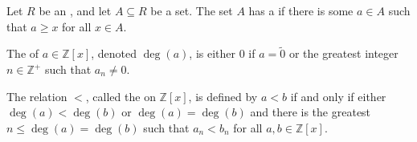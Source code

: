 \begin{definition}
	Let $R$ be an , and let $A \subseteq R$ be a set.
	The set $A$ has a \emph{} if there is some $a \in A$ such that $a \geq x$ for all $x \in A$.
\end{definition}

\begin{definition}
	The \emph{} of $a \in \mathbb{Z}[x]$, denoted $\deg(a)$, is either $0$ if $a = \widetilde{0}$ or the greatest integer $n \in \mathbb{Z}^{+}$ such that $a_n \not= 0$.
\end{definition}

\begin{definition}
	The relation $<$, called the \emph{} on $\mathbb{Z}[x]$, is defined by $a < b$ if and only if either $\deg(a) < \deg(b)$ or $\deg(a) = \deg(b)$ and there is the greatest ${n \leq \deg(a) = \deg(b)}$ such that $a_n < b_n$ for all $a, b \in \mathbb{Z}[x]$.
\end{definition}

